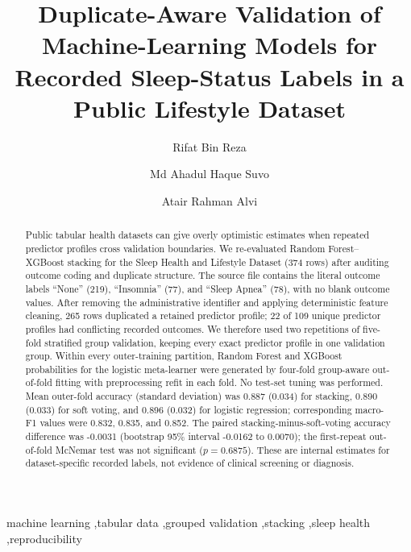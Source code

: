 \documentclass[preprint,12pt]{elsarticle}
\begin{document}
\begin{frontmatter}

\title{Duplicate-Aware Validation of Machine-Learning Models for Recorded Sleep-Status Labels in a Public Lifestyle Dataset}

\author[bracu]{Rifat Bin Reza}
\author[aau]{Md Ahadul Haque Suvo}
\author[bracu]{Atair Rahman Alvi}
\address[bracu]{BSRM School of Engineering, Department of Electrical and Electronic Engineering, BRAC University, Dhaka, Bangladesh}
\address[aau]{Department of Avionics Engineering, Aviation and Aerospace University, Dhaka, Bangladesh}

\begin{abstract}
Public tabular health datasets can give overly optimistic estimates when repeated predictor profiles cross validation boundaries. We re-evaluated Random Forest--XGBoost stacking for the Sleep Health and Lifestyle Dataset (374 rows) after auditing outcome coding and duplicate structure. The source file contains the literal outcome labels ``None'' (219), ``Insomnia'' (77), and ``Sleep Apnea'' (78), with no blank outcome values. After removing the administrative identifier and applying deterministic feature cleaning, 265 rows duplicated a retained predictor profile; 22 of 109 unique predictor profiles had conflicting recorded outcomes. We therefore used two repetitions of five-fold stratified group validation, keeping every exact predictor profile in one validation group. Within every outer-training partition, Random Forest and XGBoost probabilities for the logistic meta-learner were generated by four-fold group-aware out-of-fold fitting with preprocessing refit in each fold. No test-set tuning was performed. Mean outer-fold accuracy (standard deviation) was 0.887 (0.034) for stacking, 0.890 (0.033) for soft voting, and 0.896 (0.032) for logistic regression; corresponding macro-F1 values were 0.832, 0.835, and 0.852. The paired stacking-minus-soft-voting accuracy difference was -0.0031 (bootstrap 95\% interval -0.0162 to 0.0070); the first-repeat out-of-fold McNemar test was not significant ($p=0.6875$). These are internal estimates for dataset-specific recorded labels, not evidence of clinical screening or diagnosis.
\end{abstract}

\begin{keyword}
machine learning \sep tabular data \sep grouped validation \sep stacking \sep sleep health \sep reproducibility
\end{keyword}
\end{frontmatter}
\end{document}
